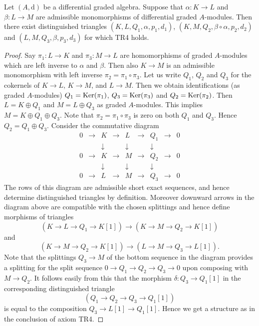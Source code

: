 \begin{lemma}
\label{lemma-two-split-injections}
Let $(A, \text{d})$ be a differential graded algebra. Suppose that
$\alpha : K \to L$ and $\beta : L \to M$ are admissible monomorphisms
of differential graded $A$-modules. Then there exist distinguished triangles
$(K, L, Q_1, \alpha, p_1, d_1)$, $(K, M, Q_2, \beta \circ \alpha, p_2, d_2)$
and $(L, M, Q_3, \beta, p_3, d_3)$ for which TR4 holds.
\end{lemma}

\begin{proof}
Say $\pi_1 : L \to K$ and $\pi_3 : M \to L$ are homomorphisms
of graded $A$-modules which are left inverse to $\alpha$ and $\beta$.
Then also $K \to M$ is an admissible monomorphism with left
inverse $\pi_2 = \pi_1 \circ \pi_3$. Let us write $Q_1$, $Q_2$
and $Q_3$ for the cokernels of $K \to L$, $K \to M$, and $L \to M$.
Then we obtain identifications (as graded $A$-modules)
$Q_1 = \mathop{\mathrm{Ker}}(\pi_1)$, $Q_3 = \mathop{\mathrm{Ker}}(\pi_3)$ and
$Q_2 = \mathop{\mathrm{Ker}}(\pi_2)$. Then $L = K \oplus Q_1$ and
$M = L \oplus Q_3$ as graded $A$-modules. This implies
$M = K \oplus Q_1 \oplus Q_3$. Note that $\pi_2 = \pi_1 \circ \pi_3$
is zero on both $Q_1$ and $Q_3$. Hence $Q_2 = Q_1 \oplus Q_3$.
Consider the commutative diagram
$$
\begin{matrix}
0 & \to & K & \to & L & \to & Q_1 & \to & 0 \\
  &     & \downarrow &     & \downarrow &     & \downarrow  & \\
0 & \to & K & \to & M & \to & Q_2 & \to & 0 \\
  &     & \downarrow &     & \downarrow &     & \downarrow  & \\
0 & \to & L & \to & M & \to & Q_3 & \to & 0
\end{matrix}
$$
The rows of this diagram are admissible short exact sequences, and
hence determine distinguished triangles by definition. Moreover
downward arrows in the diagram above are compatible with the chosen
splittings and hence define morphisms of triangles
$$
(K \to L \to Q_1 \to K[1])
\longrightarrow
(K \to M \to Q_2 \to K[1])
$$
and
$$
(K \to M \to Q_2 \to K[1])
\longrightarrow
(L \to M \to Q_3 \to L[1]).
$$
Note that the splittings $Q_3 \to M$ of the bottom sequence in the
diagram provides a splitting for the split sequence
$0 \to Q_1 \to Q_2 \to Q_3 \to 0$ upon composing with $M \to Q_2$.
It follows easily from this that the morphism $\delta : Q_3 \to Q_1[1]$
in the corresponding distinguished triangle
$$
(Q_1 \to Q_2 \to Q_3 \to Q_1[1])
$$
is equal to the composition $Q_3 \to L[1] \to Q_1[1]$.
Hence we get a structure as in the conclusion of axiom TR4.
\end{proof}

